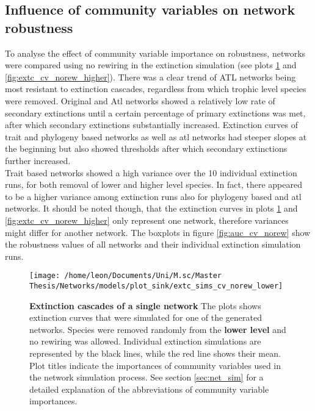 \documentclass[12pt,a4paper]{article}
\begin{document}
\subsection{Influence of community variables on network robustness}

To analyse the effect of community variable importance on robustness, networks were compared using no rewiring in the extinction simulation (see plots \ref{fig:extc_cv_norew_lower} and \ref{fig:extc_cv_norew_higher}). There was a clear trend of ATL networks being most resistant to extinction cascades, regardless from which trophic level species were removed. Original and Atl networks showed a relatively low rate of secondary extinctions until a certain percentage of primary extinctions was met, after which secondary extinctions substantially increased. Extinction curves of trait and phylogeny based networks as well as atl networks had steeper slopes at the beginning but also showed thresholds after which secondary extinctions further increased.\\
Trait based networks showed a high variance over the 10 individual extinction runs, for both removal of lower and higher level species. In fact, there appeared to be a higher variance among extinction runs also for phylogeny based and atl networks. It should be noted though, that the extinction curves in plots \ref{fig:extc_cv_norew_lower} and \ref{fig:extc_cv_norew_higher} only represent one network, therefore variances might differ for another network. The boxplots in figure \ref{fig:auc_cv_norew} show the robustness values of all networks and their individual extinction simulation runs.




\begin{figure}[H]
	 \centering
	 \texttt{[image: /home/leon/Documents/Uni/M.sc/Master Thesis/Networks/models/plot\_sink/extc\_sims\_cv\_norew\_lower]}
	 \captionsetup{width = \textwidth}
	 \caption{\textbf{Extinction cascades of a single network} The plots shows extinction curves that were simulated for one of the generated networks. Species were removed randomly from the \textbf{lower level} and no rewiring was allowed. Individual extinction simulations are represented by the black lines, while the red line shows their mean. Plot titles indicate the importances of community variables used in the network simulation process. See section \ref{sec:net_sim} for a detailed explanation of the abbreviations of community variable importances.}
	 \label{fig:extc_cv_norew_lower}
\end{figure}
\end{document}
